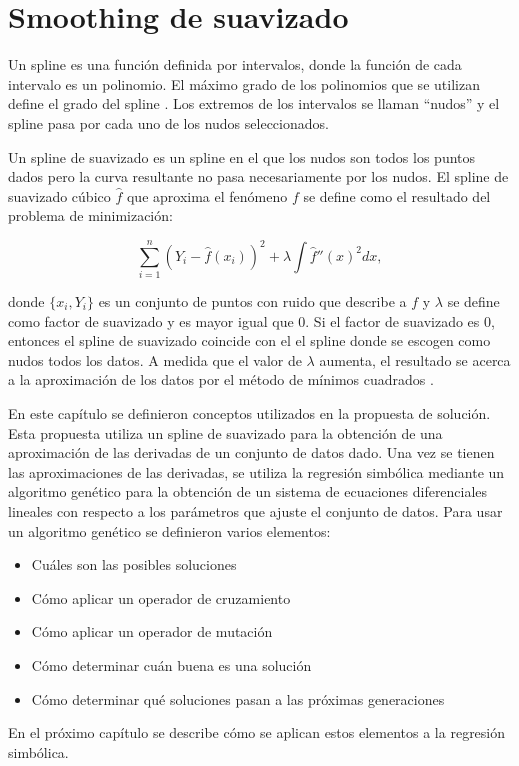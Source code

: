 \section{Smoothing de suavizado}\label{section:smoothing_splines}

Un spline es una función definida por intervalos, donde la función de cada intervalo es un polinomio. El máximo grado de los polinomios que se utilizan define el grado del spline \cite{ahlberg1967theory}. Los extremos de los intervalos se llaman ``nudos'' y el spline pasa por cada uno de los nudos seleccionados.

Un spline de suavizado es un spline en el que los nudos son todos los puntos dados pero la curva resultante no pasa necesariamente por los nudos. El spline de suavizado cúbico $\hat{f}$ que aproxima el fenómeno $f$ se define como el resultado del problema de minimización:

$$\sum_{i=1}^n (Y_i - \hat{f}(x_i))^2 + \lambda \int \hat{f}''(x)^2 dx,$$

donde $\{x_i, Y_i\}$ es un conjunto de puntos con ruido que describe a $f$ y $\lambda$ se define como factor de suavizado y es mayor igual que 0. Si el factor de suavizado es 0, entonces el spline de suavizado coincide con el el spline donde se escogen como nudos todos los datos. A medida que el valor de $\lambda$ aumenta, el resultado se acerca a la aproximación de los datos por el método de mínimos cuadrados \cite{green1993nonparametric}.

En este capítulo se definieron conceptos utilizados en la propuesta de solución. Esta propuesta utiliza un spline de suavizado para la obtención de una aproximación de las derivadas de un conjunto de datos dado. Una vez se tienen las aproximaciones de las derivadas, se utiliza la regresión simbólica mediante un algoritmo genético para la obtención de un sistema de ecuaciones diferenciales lineales con respecto a los parámetros que ajuste el conjunto de datos. Para usar un algoritmo genético se definieron varios elementos:

\begin{itemize}
    \item Cuáles son las posibles soluciones
    \item Cómo aplicar un operador de cruzamiento
    \item Cómo aplicar un operador de mutación
    \item Cómo determinar cuán buena es una solución
    \item Cómo determinar qué soluciones pasan a las próximas generaciones
\end{itemize}

En el próximo capítulo se describe cómo se aplican estos elementos a la regresión simbólica.
